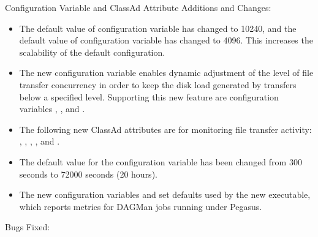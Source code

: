 \noindent Configuration Variable and ClassAd Attribute Additions and Changes:

\begin{itemize}

\item The default value of configuration variable
 has changed to 10240,
and the default value of configuration variable 
 has changed to 4096.
This increases the scalability of the default configuration.

\item The new configuration variable
 enables dynamic
adjustment of the level of file transfer concurrency in order to
keep the disk load generated by transfers below a specified level.
Supporting this new feature are configuration variables
,
, and
.

\item The following new  ClassAd attributes are for
monitoring file transfer activity:
,
,
,
, and
.

\item The default value for the configuration variable
 has been changed from 300 seconds to
72000 seconds (20 hours).

\item The new configuration variables
 and
set defaults used by the new  executable,
which reports metrics for DAGMan jobs running under Pegasus.
\end{itemize}

\noindent Bugs Fixed:

